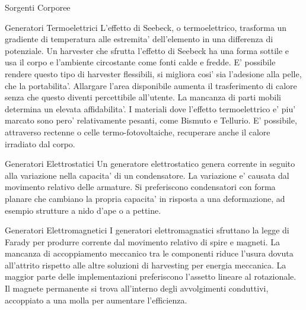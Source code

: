\begin{section}{Sorgenti Corporee}
   \begin{subsection}{Generatori Termoelettrici}
    L'effetto di Seebeck, o termoelettrico, trasforma un gradiente di temperatura alle estremita' dell'elemento in una differenza di potenziale. Un harvester che sfrutta l'effetto di Seebeck ha una forma sottile e usa il corpo e l'ambiente circostante come fonti calde e fredde. E' possibile rendere questo tipo di harvester flessibili, si migliora cosi' sia l'adesione alla pelle, che la portabilita'. Allargare l'area disponibile aumenta il trasferimento di calore senza che questo diventi percettibile all'utente. La mancanza di parti mobili determina un elevata affidabilita'. I materiali dove l'effetto termoelettrico e' piu' marcato sono pero' relativamente pesanti, come Bismuto e Tellurio. E' possibile, attraverso rectenne o celle termo-fotovoltaiche, recuperare anche il calore irradiato dal corpo.
   \end{subsection}

   \begin{subsection}{Generatori Elettrostatici}
    Un generatore elettrostatico genera corrente in seguito alla variazione nella capacita' di un condensatore. La variazione e' causata dal movimento relativo delle armature. Si preferiscono condensatori con forma planare che cambiano la propria capacita' in risposta a una deformazione, ad esempio strutture a nido d'ape o a pettine.
   \end{subsection}

   \begin{subsection}{Generatori Elettromagnetici}
    I generatori elettromagnatici sfruttano la legge di Farady per produrre corrente dal movimento relativo di spire e magneti. La mancanza di accoppiamento meccanico tra le componenti riduce l'usura dovuta all'attrito rispetto alle altre soluzioni di harvesting per energia meccanica. La maggior parte delle implementazioni preferiscono l'assetto lineare al rotazionale. Il magnete permanente si trova all'interno degli avvolgimenti conduttivi, accoppiato a una molla per aumentare l'efficienza.
   \end{subsection}
   

\end{section}
